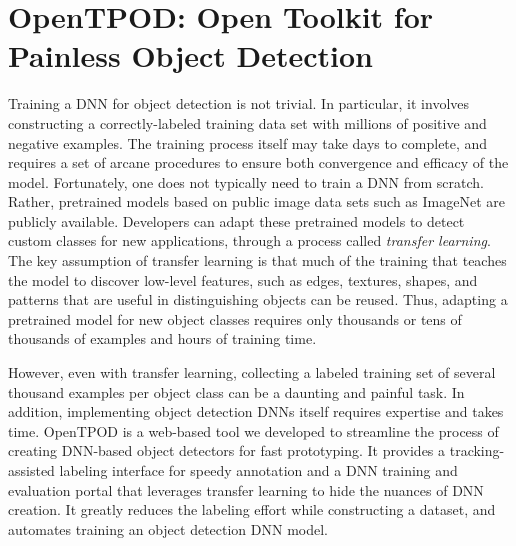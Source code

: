 \section{OpenTPOD: Open Toolkit for Painless Object Detection}
\label{sec: app-dev-tpod}

Training a DNN for object detection is not trivial.  In particular, it involves
constructing a correctly-labeled training data set with millions of positive and
negative examples. The training process itself may take days to complete, and
requires a set of arcane procedures to ensure both convergence and efficacy of
the model. Fortunately, one does not typically need to train a DNN from scratch.
Rather, pretrained models based on public image data sets such as ImageNet are
publicly available. Developers can adapt these pretrained models to detect
custom classes for new applications, through a process called \emph{transfer
learning}.  The key assumption of transfer learning is that much of the training
that teaches the model to discover low-level features, such as edges, textures,
shapes, and patterns that are useful in distinguishing objects can be reused.
Thus, adapting a pretrained model for new object classes requires only thousands
or tens of thousands of examples and hours of training time. 

However, even with transfer learning, collecting a labeled training set of
several thousand examples per object class can be a daunting and painful task.
In addition, implementing object detection DNNs itself requires expertise and
takes time. OpenTPOD is a web-based tool we developed to streamline the process of
creating DNN-based object detectors for fast prototyping. It provides a
tracking-assisted labeling interface for speedy annotation and a DNN training
and evaluation portal that leverages transfer learning to hide the nuances of
DNN creation. It greatly reduces the labeling effort while constructing a
dataset, and automates training an object detection DNN model.


